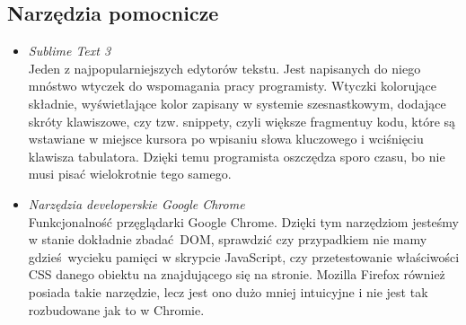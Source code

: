   \subsection{Narzędzia pomocnicze}
    \begin{itemize}
      \item \emph{Sublime Text 3} \\ Jeden z najpopularniejszych edytorów tekstu. Jest napisanych do niego mnóstwo wtyczek do wspomagania pracy programisty. Wtyczki kolorujące składnie, wyświetlające kolor zapisany w systemie szesnastkowym, dodające skróty klawiszowe, czy tzw. snippety, czyli większe fragmentuy kodu, które są wstawiane w miejsce kursora po wpisaniu słowa kluczowego i wciśnięciu klawisza tabulatora. Dzięki temu programista oszczędza sporo czasu, bo nie musi pisać wielokrotnie tego samego.
      \item \emph{Narzędzia developerskie Google Chrome} \\ Funkcjonalność przęglądarki Google Chrome. Dzięki tym narzędziom jesteśmy w stanie dokładnie zbadać DOM, sprawdzić czy przypadkiem nie mamy gdzieś wycieku pamięci w skrypcie JavaScript, czy przetestowanie właściwości CSS danego obiektu na znajdującego się na stronie. Mozilla Firefox również posiada takie narzędzie, lecz jest ono dużo mniej intuicyjne i nie jest tak rozbudowane jak to w Chromie.
    \end{itemize}

